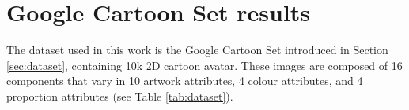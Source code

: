 \documentclass{article}
\begin{document}

\section{Google Cartoon Set results} \label{sec:cartoon-results}
The dataset used in this work is the Google Cartoon Set \cite{cartoonset} introduced in Section 
\ref{sec:dataset}, containing 10k 2D cartoon avatar. These images are composed of 16 components 
that vary in 10 artwork attributes, 4 colour attributes, and 4 proportion attributes (see Table 
\ref{tab:dataset}). 
\end{document}
